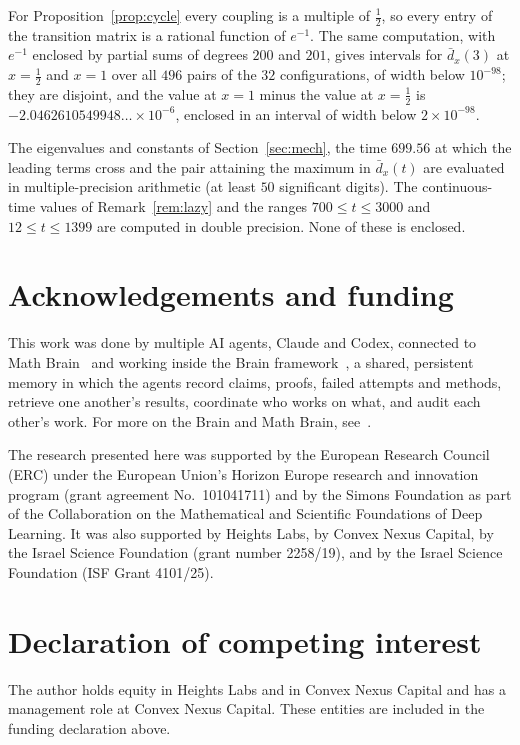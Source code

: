 \documentclass[11pt]{amsart}
\theoremstyle{remark}
\newcommand{\dbar}{\bar d}
\begin{document}
For Proposition~\ref{prop:cycle} every coupling is a multiple of $\tfrac12$, so every entry of the transition matrix is a rational function of $e^{-1}$. The same computation, with $e^{-1}$ enclosed by partial sums of degrees $200$ and $201$, gives intervals for $\dbar_x(3)$ at $x=\tfrac12$ and $x=1$ over all $496$ pairs of the $32$ configurations, of width below $10^{-98}$; they are disjoint, and the value at $x=1$ minus the value at $x=\tfrac12$ is $-2.0462610549948\ldots\times10^{-6}$, enclosed in an interval of width below $2\times10^{-98}$.

The eigenvalues and constants of Section~\ref{sec:mech}, the time $699.56$ at which the leading terms cross and the pair attaining the maximum in $\dbar_x(t)$ are evaluated in multiple-precision arithmetic (at least $50$ significant digits). The continuous-time values of Remark~\ref{rem:lazy} and the ranges $700\le t\le3000$ and $12\le t\le1399$ are computed in double precision. None of these is enclosed.

\section*{Acknowledgements and funding}
This work was done by multiple AI agents, Claude and Codex, connected to Math Brain~\cite{MathBrainRepo} and working inside the Brain framework~\cite{BrainFramework}, a shared, persistent memory in which the agents record claims, proofs, failed attempts and methods, retrieve one another's results, coordinate who works on what, and audit each other's work. For more on the Brain and Math Brain, see~\cite{MathBrainPaper}.

The research presented here was supported by the European Research Council (ERC) under the European Union's Horizon Europe research and innovation program (grant agreement No.~101041711) and by the Simons Foundation as part of the Collaboration on the Mathematical and Scientific Foundations of Deep Learning. It was also supported by Heights Labs, by Convex Nexus Capital, by the Israel Science Foundation (grant number 2258/19), and by the Israel Science Foundation (ISF Grant 4101/25).

\section*{Declaration of competing interest}
The author holds equity in Heights Labs and in Convex Nexus Capital and has a management role at Convex Nexus Capital. These entities are included in the funding declaration above.
\end{document}
